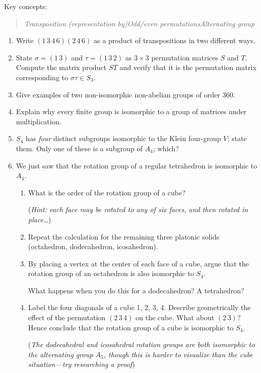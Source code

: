 \begin{exercises}
Key concepts:
\begin{quote}
	\emph{Transposition (representation by)\quad Odd/even permutations\quad Alternating group}
\end{quote}

\begin{enumerate}
  \item Write $(1\,3\,4\,6)(2\,4\,6)$ as a product of transpositions in two different ways.
  
  
  \item State $\sigma=(1\,3)$ and $\tau=(1\,3\,2)$ as $3\times 3$ permutation matrices $S$ and $T$. Compute the matrix product $ST$ and verify that it is the permutation matrix corresponding to $\sigma\tau\in S_3$.
  
  
  \item Give examples of two non-isomorphic non-abelian groups of order 360.
  
  
  \item Explain why every finite group is isomorphic to a group of matrices under multiplication.
  
  
  \item $S_4$ has \emph{four} distinct subgroups isomorphic to the Klein four-group $V$; state them. Only one of these is a subgroup of $A_4$; which?
  
  
  \item We just saw that the rotation group of a regular tetrahedron is isomorphic to $A_4$.
  \begin{enumerate}
    \item What is the order of the rotation group of a cube?\par
    (\emph{Hint: each face may be rotated to any of six faces, and then rotated in place\ldots})
    
    \item Repeat the calculation for the remaining three platonic solids (octahedron, dodecahedron, icosahedron).
    
    \item By placing a vertex at the center of each face of a cube, argue that the rotation group of an octahedron is also isomorphic to $S_4$.\par
    What happens when you do this for a dodecahedron? A tetrahedron?
    
    \item Label the four diagonals of a cube 1, 2, 3, 4. Describe geometrically the effect of the permutation $(2\,3\,4)$ on the cube. What about $(2\,3)$? Hence conclude that the rotation group of a cube is isomorphic to $S_4$.\par
    (\emph{The dodecahedral and icosahedral rotation groups are both isomorphic to the alternating group $A_5$, though this is harder to visualize than the cube situation---try researching a proof})
  \end{enumerate}
  

\end{enumerate}
\end{exercises}
